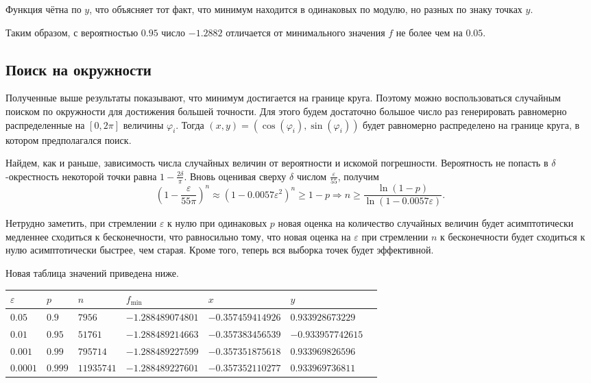 \documentclass[12pt, a4paper]{article}
\begin{document}
Функция чётна по $y$, что объясняет тот факт, что минимум находится в одинаковых по модулю, но разных по знаку точках $y$.

Таким образом, с вероятностью $0.95$ число $-1.2882$ отличается от минимального значения $f$ не более чем на $0.05$.

\subsection*{Поиск на окружности}
Полученные выше результаты показывают, что минимум достигается на границе круга. Поэтому можно воспользоваться случайным поиском по окружности для достижения большей точности. Для этого будем достаточно большое число раз генерировать равномерно распределенные на $\left[ 0, 2\pi \right]$ величины $\varphi_i$. Тогда $(x,y) = \left(\cos(\varphi_i),\sin\left(\varphi_i\right)\right)$ будет равномерно распределено на границе круга, в котором предполагался поиск. 

Найдем, как и раньше, зависимость числа случайных величин от вероятности и искомой погрешности. Вероятность не попасть в $\delta$-окрестность некоторой точки равна $1-\frac{2\delta}{\pi}$. Вновь оценивая сверху $\delta$ числом $\frac{\varepsilon}{55}$, получим 
 \[ \left(1-\frac{\varepsilon}{55\pi}\right)^n \approx \left( 1-0.0057\varepsilon^2 \right) ^n \geqslant 1-p \Rightarrow  n \geqslant \frac{\ln(1-p)}{\ln\left( 1-0.0057\varepsilon \right) }.\] 
 
 Нетрудно заметить, при стремлении $\varepsilon$ к нулю при одинаковых $p$ новая оценка на количество случайных величин будет асимптотически медленнее сходиться к бесконечности, что равносильно тому, что новая оценка на $\varepsilon$ при стремлении $n$ к бесконечности будет сходиться к нулю асимптотически быстрее, чем старая. Кроме того, теперь вся выборка точек будет эффективной.

Новая таблица значений приведена ниже.

\begin{tabular}{|l|l|l|l|l|l|l|}
\hline
$\varepsilon$ & $p$ & $n$ & $f_{\min}$ &$x$& $y$ \\
\hline
$0.05$ & $0.9$ & $7956$ & $-1.288489074801$ & $-0.357459414926$ & $0.933928673229$ \\
$0.01$ & $0.95$ & $51761$ & $-1.288489214663$ & $-0.357383456539$ & $-0.933957742615$ \\
$0.001$ & $0.99$ & $795714$ & $-1.288489227599$ & $-0.357351875618$ & $0.933969826596$ \\
$0.0001$ & $0.999$ & $11935741$ & $-1.288489227601$ & $-0.357352110277$ & $0.933969736811$ \\
\hline
\end{tabular}
\end{document}
